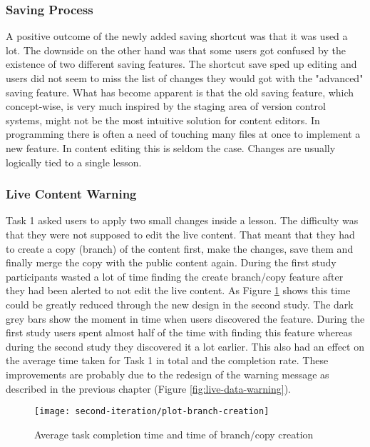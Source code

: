 
\subsubsection{Saving Process}
A positive outcome of the newly added saving shortcut was that it was used a lot. The downside on the other hand was that some users got confused by the existence of two different saving features. The shortcut save sped up editing and users did not seem to miss the list of changes they would got with the "advanced" saving feature. What has become apparent is that the old saving feature, which concept-wise, is very much inspired by the staging area of version control systems, might not be the most intuitive solution for content editors. In programming there is often a need of touching many files at once to implement a new feature. In content editing this is seldom the case. Changes are usually logically tied to a single lesson.

\subsubsection{Live Content Warning}
Task 1 asked users to apply two small changes inside a lesson. The difficulty was that they were not supposed to edit the live content. That meant that they had to create a copy (branch) of the content first, make the changes, save them and finally merge the copy with the public content again. During the first study participants wasted a lot of time finding the create branch/copy feature after they had been alerted to not edit the live content. As Figure \ref{fig:avg-time-task1} shows this time could be greatly reduced through the new design in the second study. The dark grey bars show the moment in time when users discovered the feature. During the first study users spent almost half of the time with finding this feature whereas during the second study they discovered it a lot earlier. This also had an effect on the average time taken for Task 1 in total and the completion rate. These improvements are probably due to the redesign of the warning message as described in the previous chapter (Figure \ref{fig:live-data-warning}).

\begin{figure}[h!]
 \centering
 \texttt{[image: second-iteration/plot-branch-creation]}
 \caption{Average task completion time and time of branch/copy creation}
 \label{fig:avg-time-task1}
\end{figure}

